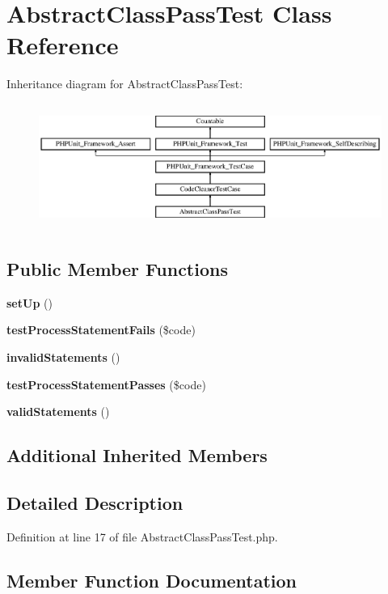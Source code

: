 \section{Abstract\+Class\+Pass\+Test Class Reference}
\label{class_psy_1_1_test_1_1_code_cleaner_1_1_abstract_class_pass_test}
Inheritance diagram for Abstract\+Class\+Pass\+Test\+:\begin{figure}[H]
\begin{center}
\leavevmode
\includegraphics[height=4.129793cm]{class_psy_1_1_test_1_1_code_cleaner_1_1_abstract_class_pass_test}
\end{center}
\end{figure}
\subsection*{Public Member Functions}
\begin{DoxyCompactItemize}
\item 
{\bf set\+Up} ()
\item 
{\bf test\+Process\+Statement\+Fails} (\$code)
\item 
{\bf invalid\+Statements} ()
\item 
{\bf test\+Process\+Statement\+Passes} (\$code)
\item 
{\bf valid\+Statements} ()
\end{DoxyCompactItemize}
\subsection*{Additional Inherited Members}


\subsection{Detailed Description}


Definition at line 17 of file Abstract\+Class\+Pass\+Test.\+php.



\subsection{Member Function Documentation}
